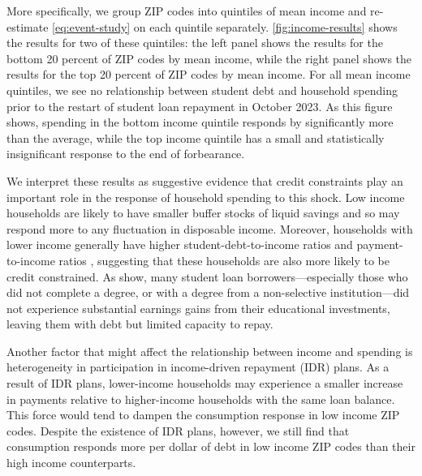 \documentclass[12pt]{article}
\begin{document}
More specifically, we group ZIP codes into quintiles of mean income and re-estimate \cref{eq:event-study} on each quintile separately. \cref{fig:income-results} shows the results for two of these quintiles: the left panel shows the results for the bottom 20 percent of ZIP codes by mean income, while the right panel shows the results for the top 20 percent of ZIP codes by mean income. For all mean income quintiles, we see no relationship between student debt and household spending prior to the restart of student loan repayment in October 2023. As this figure shows, spending in the bottom income quintile responds by significantly more than the average, while the top income quintile has a small and statistically insignificant response to the end of forbearance. 

We interpret these results as suggestive evidence that credit constraints play an important role in the response of household spending to this shock. Low income households are likely to have smaller buffer stocks of liquid savings and so may respond more to any fluctuation in disposable income. \citep[See, for example:][]{fagerengHolmNatvik2021} Moreover, households with lower income generally have higher student-debt-to-income ratios and payment-to-income ratios \citep{Beamer_2021, Perry_et_al_brookings}, suggesting that these households are also more likely to be credit constrained. As \cite{looney-yannelis} show, many student loan borrowers---especially those who did not complete a degree, or with a degree from a non-selective institution---did not experience substantial earnings gains from their educational investments, leaving them with debt but limited capacity to repay.

Another factor that might affect the relationship between income and spending is heterogeneity in participation in income-driven repayment (IDR) plans. As a result of IDR plans, lower-income households may experience a smaller increase in payments relative to higher-income households with the same loan balance. This force would tend to dampen the consumption response in low income ZIP codes. Despite the existence of IDR plans, however, we still find that consumption responds more per dollar of debt in low income ZIP codes than their high income counterparts. 
\end{document}
